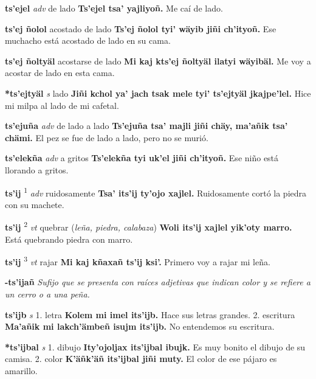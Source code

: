 \documentclass[10pt]{scrbook}
\newcommand{\entry}[1]{\textbf{#1}}
\newcommand{\onedefinition}[1]{#1.}
\newcommand{\defsuperscript}[1]{\textsuperscript{#1}}
\newcommand{\nontranslationdef}[1]{\textit{#1}}
\newcommand{\partofspeech}[1]{\textit{#1}}
\newcommand{\spanishtranslation}[1]{#1}
\newcommand{\clarification}[1]{(\textit{#1})}
\newcommand{\cholexample}[1]{\textbf{#1}}
\newcommand{\exampletranslation}[1]{#1}
\begin{document}
\begin{multicols}{2}
\entry{ts'ejel}
\partofspeech{adv}
\spanishtranslation{de lado}
\cholexample{Ts'ejel tsa' yajliyoñ.}
\exampletranslation{Me caí de lado.}

\entry{ts'ej ñolol}
\spanishtranslation{acostado de lado}
\cholexample{Ts'ej ñolol tyi' wäyib jiñi ch'ityoñ.}
\exampletranslation{Ese muchacho está acostado de lado en su cama.}

\entry{ts'ej ñoltyäl}
\spanishtranslation{acostarse de lado}
\cholexample{Mi kaj kts'ej ñoltyäl ilatyi wäyibäl.}
\exampletranslation{Me voy a acostar de lado en esta cama.}

\entry{*ts'ejtyäl}
\partofspeech{s}
\spanishtranslation{lado}
\cholexample{Jiñi kchol ya' jach tsak mele tyi' ts'ejtyäl jkajpe'lel.}
\exampletranslation{Hice mi milpa al lado de mi cafetal.}

\entry{ts'ejuña}
\partofspeech{adv}
\spanishtranslation{de lado a lado}
\cholexample{Ts'ejuña tsa' majli jiñi chäy, ma'añik tsa' chämi.}
\exampletranslation{El pez se fue de lado a lado, pero no se murió.}

\entry{ts'elekña}
\partofspeech{adv}
\spanishtranslation{a gritos}
\cholexample{Ts'elekña tyi uk'el jiñi ch'ityoñ.}
\exampletranslation{Ese niño está llorando a gritos.}

\entry{ts'ij}
\defsuperscript{1}
\partofspeech{adv}
\spanishtranslation{ruidosamente}
\cholexample{Tsa' its'ij ty'ojo xajlel.}
\exampletranslation{Ruidosamente cortó la piedra con su machete.}

\entry{ts'ij}
\defsuperscript{2}
\partofspeech{vt}
\spanishtranslation{quebrar}
\clarification{leña, piedra, calabaza}
\cholexample{Woli its'ij xajlel yik'oty marro.}
\exampletranslation{Está quebrando piedra con marro.}

\entry{ts'ij}
\defsuperscript{3}
\partofspeech{vt}
\spanishtranslation{rajar}
\cholexample{Mi kaj kñaxañ ts'ij ksi'.}
\exampletranslation{Primero voy a rajar mi leña.}

\entry{-ts'ijañ}
\nontranslationdef{Sufijo que se presenta con raíces adjetivas que indican color y se refiere a un cerro o a una peña.}

\entry{ts'ijb}
\partofspeech{s}
\onedefinition{1}
\spanishtranslation{letra}
\cholexample{Kolem mi imel its'ijb.}
\exampletranslation{Hace sus letras grandes.}
\onedefinition{2}
\spanishtranslation{escritura}
\cholexample{Ma'añik mi lakch'ämbeñ isujm its'ijb.}
\exampletranslation{No entendemos su escritura.}

\entry{*ts'ijbal}
\partofspeech{s}
\onedefinition{1}
\spanishtranslation{dibujo}
\cholexample{Ity'ojoljax its'ijbal ibujk.}
\exampletranslation{Es muy bonito el dibujo de su camisa.}
\onedefinition{2}
\spanishtranslation{color}
\cholexample{K'äñk'äñ its'ijbal jiñi muty.}
\exampletranslation{El color de ese pájaro es amarillo.}


\end{multicols}
\end{document}
